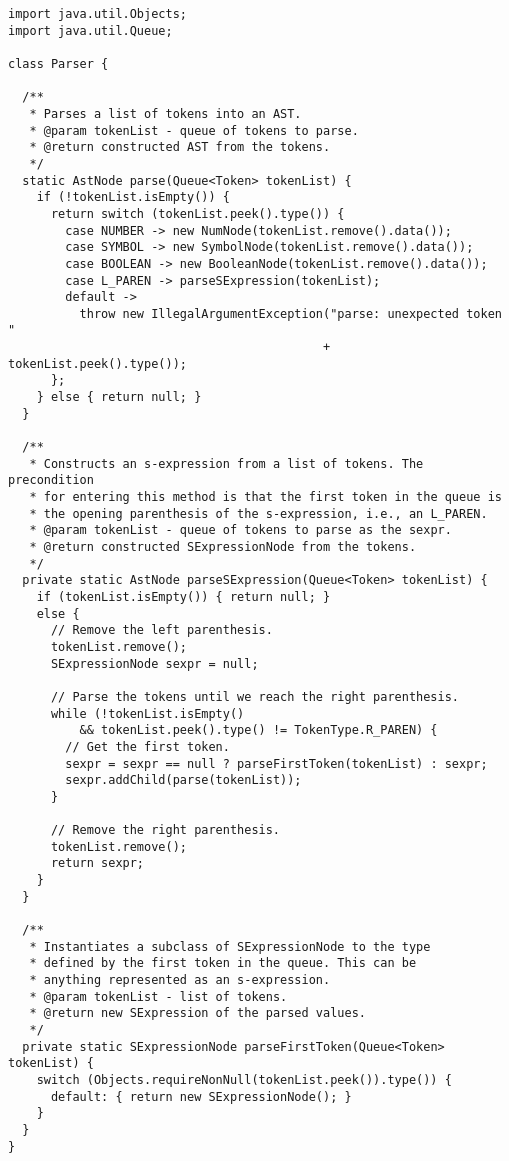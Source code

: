 \begin{lstlisting}[language=MyJava]
import java.util.Objects;
import java.util.Queue;

class Parser {

  /**
   * Parses a list of tokens into an AST.
   * @param tokenList - queue of tokens to parse.
   * @return constructed AST from the tokens.
   */
  static AstNode parse(Queue<Token> tokenList) {
    if (!tokenList.isEmpty()) {
      return switch (tokenList.peek().type()) {
        case NUMBER -> new NumNode(tokenList.remove().data());
        case SYMBOL -> new SymbolNode(tokenList.remove().data());
        case BOOLEAN -> new BooleanNode(tokenList.remove().data());
        case L_PAREN -> parseSExpression(tokenList);
        default -> 
          throw new IllegalArgumentException("parse: unexpected token " 
                                            + tokenList.peek().type());
      };
    } else { return null; }
  }

  /**
   * Constructs an s-expression from a list of tokens. The precondition
   * for entering this method is that the first token in the queue is
   * the opening parenthesis of the s-expression, i.e., an L_PAREN.
   * @param tokenList - queue of tokens to parse as the sexpr.
   * @return constructed SExpressionNode from the tokens.
   */
  private static AstNode parseSExpression(Queue<Token> tokenList) {
    if (tokenList.isEmpty()) { return null; }
    else {
      // Remove the left parenthesis.
      tokenList.remove();
      SExpressionNode sexpr = null;

      // Parse the tokens until we reach the right parenthesis.
      while (!tokenList.isEmpty() 
          && tokenList.peek().type() != TokenType.R_PAREN) {
        // Get the first token.
        sexpr = sexpr == null ? parseFirstToken(tokenList) : sexpr;
        sexpr.addChild(parse(tokenList));
      }

      // Remove the right parenthesis.
      tokenList.remove();
      return sexpr;
    }
  }

  /**
   * Instantiates a subclass of SExpressionNode to the type 
   * defined by the first token in the queue. This can be 
   * anything represented as an s-expression.
   * @param tokenList - list of tokens.
   * @return new SExpression of the parsed values.
   */
  private static SExpressionNode parseFirstToken(Queue<Token> tokenList) {
    switch (Objects.requireNonNull(tokenList.peek()).type()) {
      default: { return new SExpressionNode(); }
    }
  }
}
\end{lstlisting}

